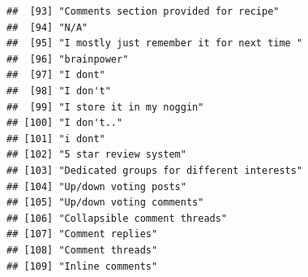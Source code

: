 \documentclass[
]{article}
\begin{document}
\begin{verbatim}
##  [93] "Comments section provided for recipe"                                     
##  [94] "N/A"                                                                      
##  [95] "I mostly just remember it for next time "                                 
##  [96] "brainpower"                                                               
##  [97] "I dont"                                                                   
##  [98] "I don't"                                                                  
##  [99] "I store it in my noggin"                                                  
## [100] "I don't.."                                                                
## [101] "i dont"                                                                   
## [102] "5 star review system"                                                     
## [103] "Dedicated groups for different interests"                                 
## [104] "Up/down voting posts"                                                     
## [105] "Up/down voting comments"                                                  
## [106] "Collapsible comment threads"                                              
## [107] "Comment replies"                                                          
## [108] "Comment threads"                                                          
## [109] "Inline comments"
\end{verbatim}
\end{document}
